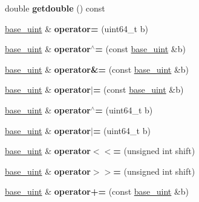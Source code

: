 \begin{DoxyCompactItemize}
double {\bfseries getdouble} () const
\item 
\mbox{\label{classbase__uint_a115a5ddb2f2637e09703a25cfc580483}} 
\mbox{\hyperlink{classbase__uint}{base\+\_\+uint}} \& {\bfseries operator=} (uint64\+\_\+t b)
\item 
\mbox{\label{classbase__uint_ad5ec10977ebeab115fe857637990e267}} 
\mbox{\hyperlink{classbase__uint}{base\+\_\+uint}} \& {\bfseries operator$^\wedge$=} (const \mbox{\hyperlink{classbase__uint}{base\+\_\+uint}} \&b)
\item 
\mbox{\label{classbase__uint_a6cb549b322e5bbcca794366f5fd3fb15}} 
\mbox{\hyperlink{classbase__uint}{base\+\_\+uint}} \& {\bfseries operator\&=} (const \mbox{\hyperlink{classbase__uint}{base\+\_\+uint}} \&b)
\item 
\mbox{\label{classbase__uint_ab116d89cbae68b32fbecf5d1de98bb2e}} 
\mbox{\hyperlink{classbase__uint}{base\+\_\+uint}} \& {\bfseries operator$\vert$=} (const \mbox{\hyperlink{classbase__uint}{base\+\_\+uint}} \&b)
\item 
\mbox{\label{classbase__uint_a3d77324f5c5166e4dabadac360bea6e7}} 
\mbox{\hyperlink{classbase__uint}{base\+\_\+uint}} \& {\bfseries operator$^\wedge$=} (uint64\+\_\+t b)
\item 
\mbox{\label{classbase__uint_ac8edb6e097d9eede21f8fa44e9184913}} 
\mbox{\hyperlink{classbase__uint}{base\+\_\+uint}} \& {\bfseries operator$\vert$=} (uint64\+\_\+t b)
\item 
\mbox{\label{classbase__uint_acb449d2fcb5af767fa6b01890e836a4e}} 
\mbox{\hyperlink{classbase__uint}{base\+\_\+uint}} \& {\bfseries operator$<$$<$=} (unsigned int shift)
\item 
\mbox{\label{classbase__uint_a4e0344432bbcce79525fd2c182173b3b}} 
\mbox{\hyperlink{classbase__uint}{base\+\_\+uint}} \& {\bfseries operator$>$$>$=} (unsigned int shift)
\item 
\mbox{\label{classbase__uint_a8fb3109e7c46536bb66ac41242176246}} 
\mbox{\hyperlink{classbase__uint}{base\+\_\+uint}} \& {\bfseries operator+=} (const \mbox{\hyperlink{classbase__uint}{base\+\_\+uint}} \&b)

\end{DoxyCompactItemize}
